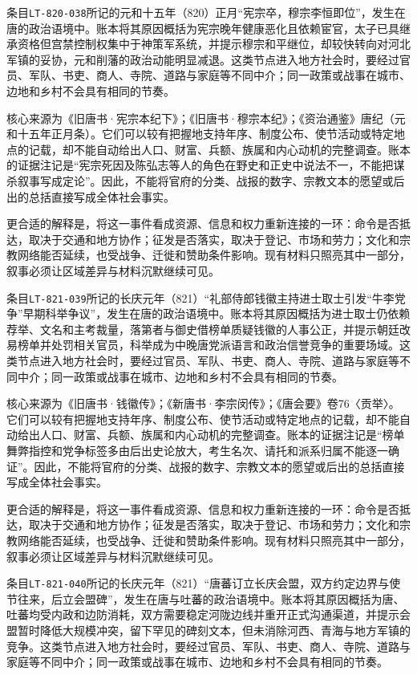条目\texttt{LT-820-038}所记的元和十五年（820）正月“宪宗卒，穆宗李恒即位”，发生在唐的政治语境中。账本将其原因概括为宪宗晚年健康恶化且依赖宦官，太子已具继承资格但宫禁控制权集中于神策军系统，并提示穆宗和平继位，却较快转向对河北军镇的妥协，元和削藩的政治动能明显减退。这类节点进入地方社会时，要经过官员、军队、书吏、商人、寺院、道路与家庭等不同中介；同一政策或战事在城市、边地和乡村不会具有相同的节奏。

核心来源为《旧唐书·宪宗本纪下》；《旧唐书·穆宗本纪》；《资治通鉴》唐纪（元和十五年正月条）。它们可以较有把握地支持年序、制度公布、使节活动或特定地点的记载，却不能自动给出人口、财富、兵额、族属和内心动机的完整调查。账本的证据注记是“宪宗死因及陈弘志等人的角色在野史和正史中说法不一，不能把谋杀叙事写成定论”。因此，不能将官府的分类、战报的数字、宗教文本的愿望或后出的总括直接写成全体社会事实。

更合适的解释是，将这一事件看成资源、信息和权力重新连接的一环：命令是否抵达，取决于交通和地方协作；征发是否落实，取决于登记、市场和劳力；文化和宗教网络能否延续，也受战争、迁徙和赞助条件影响。现有材料只照亮其中一部分，叙事必须让区域差异与材料沉默继续可见。

条目\texttt{LT-821-039}所记的长庆元年（821）“礼部侍郎钱徽主持进士取士引发“牛李党争”早期科举争议”，发生在唐的政治语境中。账本将其原因概括为进士取士仍依赖荐举、文名和主考裁量，落第者与御史借榜单质疑钱徽的人事公正，并提示朝廷改易榜单并处罚相关官员，科举成为中晚唐党派语言和政治信誉竞争的重要场域。这类节点进入地方社会时，要经过官员、军队、书吏、商人、寺院、道路与家庭等不同中介；同一政策或战事在城市、边地和乡村不会具有相同的节奏。

核心来源为《旧唐书·钱徽传》；《新唐书·李宗闵传》；《唐会要》卷76〈贡举〉。它们可以较有把握地支持年序、制度公布、使节活动或特定地点的记载，却不能自动给出人口、财富、兵额、族属和内心动机的完整调查。账本的证据注记是“榜单舞弊指控和党争标签多由后出史论放大，考生名次、请托和派系归属不能逐一确证”。因此，不能将官府的分类、战报的数字、宗教文本的愿望或后出的总括直接写成全体社会事实。

更合适的解释是，将这一事件看成资源、信息和权力重新连接的一环：命令是否抵达，取决于交通和地方协作；征发是否落实，取决于登记、市场和劳力；文化和宗教网络能否延续，也受战争、迁徙和赞助条件影响。现有材料只照亮其中一部分，叙事必须让区域差异与材料沉默继续可见。

条目\texttt{LT-821-040}所记的长庆元年（821）“唐蕃订立长庆会盟，双方约定边界与使节往来，后立会盟碑”，发生在唐与吐蕃的政治语境中。账本将其原因概括为唐、吐蕃均受内政和边防消耗，双方需要稳定河陇边线并重开正式沟通渠道，并提示会盟暂时降低大规模冲突，留下罕见的碑刻文本，但未消除河西、青海与地方军镇的竞争。这类节点进入地方社会时，要经过官员、军队、书吏、商人、寺院、道路与家庭等不同中介；同一政策或战事在城市、边地和乡村不会具有相同的节奏。

